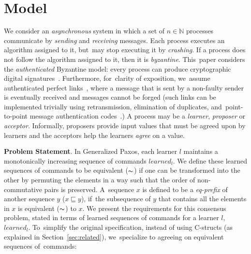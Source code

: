 \documentclass[algorithms,article,accept,moreauthors,pdftex,10pt,a4paper]{Definitions/mdpi}
\begin{document}
\section{Model}
\label{sec:model}
%
We consider an \emph{asynchronous} system in which
a set of $n \in \mathbb{N}$ processes communicate by 
\emph{sending} and \emph{receiving} messages.
Each process executes an algorithm assigned to it, but~may stop executing it by \emph{crashing}.
If a process does not follow the algorithm assigned to it, then it is \emph{byzantine}.
This~paper considers the \emph{authenticated} Byzantine model: every process can produce cryptographic digital signatures~\cite{quorum}. 
Furthermore, for~clarity of exposition, we~assume authenticated perfect links~\cite{cgr:book}, 
where a message that is sent by a non-faulty sender is eventually received and messages cannot be forged 
(such links can be implemented trivially using retransmission, elimination of duplicates, and~point-to-point message authentication codes~\cite{cgr:book}.)
A process may be a \emph{learner}, \emph{proposer} or \emph{acceptor}.
Informally, proposers provide input values that must be agreed upon by learners and the acceptors help the learners \emph{agree} on a value.


\textbf{Problem Statement}{.} %
In Generalized Paxos, each learner $l$ maintains a monotonically increasing sequence of commands $learned_l$. 
We define these learned sequences of commands to be equivalent ($\thicksim$) 
if one can be transformed into the other by permuting the elements in a way such that the order of non-commutative pairs is preserved. A~sequence $x$ is defined to be a \textit{eq-prefix} of another sequence $y$ ($x \sqsubseteq y$), if~the subsequence of $y$ that contains all the elements in $x$ is equivalent ($\thicksim$) to $x$. 
We present the requirements for this consensus problem, stated in terms of learned sequences of commands for a learner $l$, $learned_l$. To~simplify the original specification, instead of using C-structs (as explained in Section~\ref{sec:related}), we~specialize to agreeing on equivalent sequences of~commands:
\end{document}
